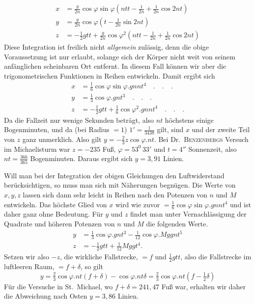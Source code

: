\[
\begin{aligned}
x&=\tfrac{g}{2n}\cos\varphi\sin\varphi(ntt-\tfrac{1}{2n}+\tfrac{1}{2n}\cos2nt)\\
y&=\tfrac{g}{2n}\cos\varphi(t-\tfrac{1}{2n}\sin2nt)\\
z&=-\tfrac12gtt+\tfrac{g}{2n}\cos\varphi^2(ntt-\tfrac{1}{2n}+\tfrac{1}{2n}\cos2nt)
\end{aligned}
\]
Diese Integration ist freilich nicht \textit{allgemein} zulässig, denn die obige Voraussetzung ist nur erlaubt, solange sich der Körper nicht weit von seinem anfänglichen scheinbaren Ort entfernt. In diesem Fall können wir aber die trigonometrischen Funktionen in Reihen entwickeln. Damit ergibt sich
\[
\begin{aligned}
x&=\tfrac16\cos\varphi\sin\varphi.gnnt^4\quad.\quad.\quad.\\
y&=\tfrac13\cos\varphi.gnt^3\quad.\quad.\quad.\\
z&=-\tfrac12gtt+\tfrac16\cos\varphi^2.gnnt^4\quad.\quad.\quad.
\end{aligned}
\]
Da die Fallzeit nur wenige Sekunden beträgt, also $nt$ höchstens einige Bogenminuten, und da (bei Radius $=1$) $1'=\tfrac{1}{3438}$ gilt, sind $x$ und der zweite Teil von $z$ ganz unmerklich. Also gilt $y=-\tfrac23z\cos\varphi.nt$. Bei Dr.\ \textsc{Benzenbergs} Versuch im Michaelisturm war $z=-235$ Fuß, $\varphi=53^0\,33'$ und $t=4''$ Sonnenzeit, also $nt=\tfrac{366}{365}$ Bogenminuten. Daraus ergibt sich $y=3{,}91$ Linien.

Will man bei der Integration der obigen Gleichungen den Luftwiderstand berücksichtigen, so muss man sich mit Näherungen begnügen. Die Werte von $x,y,z$ lassen sich dann sehr leicht in Reihen nach den Potenzen von $n$ und $M$ entwickeln. Das höchste Glied von $x$ wird wie zuvor $=\tfrac16\cos\varphi\sin\varphi.gnnt^4$ und ist daher ganz ohne Bedeutung. Für $y$ und $z$ findet man unter Vernachlässigung der Quadrate und höheren Potenzen von $n$ und $M$ die folgenden Werte.
\[
\begin{aligned}
y&=\tfrac13\cos\varphi.gnt^3-\tfrac{1}{12}\cos\varphi.Mggnt^5\\
z&=-\tfrac12gtt+\tfrac{1}{12}Mggt^4.
\end{aligned}
\]
Setzen wir also $-z$, die wirkliche Fallstrecke, $=f$ und $\tfrac12gtt$, also die Fallstrecke im luftleeren Raum, $=f+\delta$, so gilt
\[
y=\tfrac23\cos\varphi.nt(f+\delta)-\cos\varphi.nt\delta=\tfrac23\cos\varphi.nt(f-\tfrac12\delta)
\]
Für die Versuche in St.\ Michael, wo $f+\delta=241{,}47$ Fuß war, erhalten wir daher die Abweichung nach Osten $y=3{,}86$ Linien.

